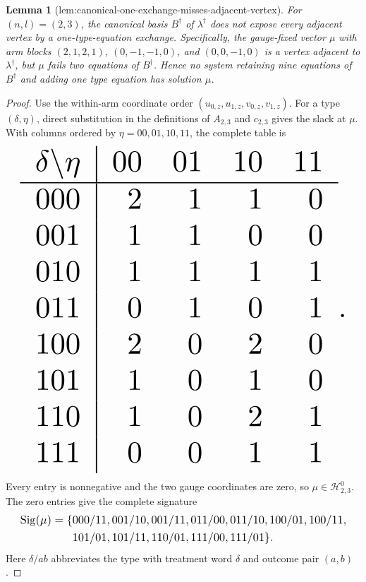 \documentclass{article}
\newtheorem{lemma}{Lemma}
\begin{document}
\begin{lemma}[lem:canonical-one-exchange-misses-adjacent-vertex]\label{lem:canonical-one-exchange-misses-adjacent-vertex}
For \((n,l)=(2,3)\), the canonical basis \(B^\dagger\) of \(\lambda^\dagger\) does not expose every adjacent vertex by a one-type-equation exchange. Specifically, the gauge-fixed vector \(\mu\) with arm blocks \((2,1,2,1)\), \((0,-1,-1,0)\), and \((0,0,-1,0)\) is a vertex adjacent to \(\lambda^\dagger\), but \(\mu\) fails two equations of \(B^\dagger\). Hence no system retaining nine equations of \(B^\dagger\) and adding one type equation has solution \(\mu\).
\end{lemma}
\begin{proof}
Use the within-arm coordinate order \((u_{0,z},u_{1,z},v_{0,z},v_{1,z})\). For a type \((\delta,\eta)\), direct substitution in the definitions of \(A_{2,3}\) and \(c_{2,3}\) gives the slack at \(\mu\). With columns ordered by \(\eta=00,01,10,11\), the complete table is
\[
\makebox[\linewidth][c]{\resizebox{0.98\linewidth}{!}{\par\noindent \makebox[\linewidth][c]{\resizebox{0.98\linewidth}{!}{\(\displaystyle \displaystyle \begin{array}{c|rrrr}\delta\backslash\eta&00&01&10&11\\ \hline 000&2&1&1&0\\001&1&1&0&0\\010&1&1&1&1\\011&0&1&0&1\\100&2&0&2&0\\101&1&0&1&0\\110&1&0&2&1\\111&0&0&1&1\end{array}.\)}}\par\noindent}}
\]
Every entry is nonnegative and the two gauge coordinates are zero, so \(\mu\in\mathcal H^0_{2,3}\). The zero entries give the complete signature
\[
\makebox[\linewidth][c]{\resizebox{0.98\linewidth}{!}{\par\noindent \makebox[\linewidth][c]{\resizebox{0.98\linewidth}{!}{\(\displaystyle \displaystyle \begin{aligned}\operatorname{Sig}(\mu)=\{&000/11,001/10,001/11,011/00,011/10,100/01,100/11,\\&101/01,101/11,110/01,111/00,111/01\}.\end{aligned}\)}}\par\noindent}}
\]
Here \(\delta/ab\) abbreviates the type with treatment word \(\delta\) and outcome pair \((a,b)\).


\end{proof}
\end{document}
